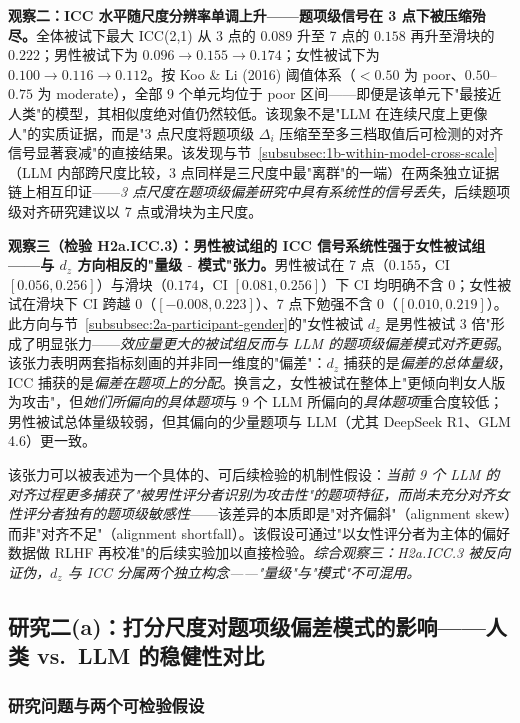 \documentclass[UTF8,12pt]{ctexart}
\begin{document}
\textbf{观察二：ICC 水平随尺度分辨率单调上升——题项级信号在 3 点下被压缩殆尽。}全体被试下最大 ICC(2,1) 从 3 点的 $0.089$ 升至 7 点的 $0.158$ 再升至滑块的 $0.222$；男性被试下为 $0.096 \to 0.155 \to 0.174$；女性被试下为 $0.100 \to 0.116 \to 0.112$。按 Koo \& Li (2016) 阈值体系（$<0.50$ 为 poor、$0.50$--$0.75$ 为 moderate），全部 9 个单元均位于 poor 区间——即便是该单元下"最接近人类"的模型，其相似度绝对值仍然较低。该现象不是"LLM 在连续尺度上更像人"的实质证据，而是"3 点尺度将题项级 $\Delta_i$ 压缩至至多三档取值后可检测的对齐信号显著衰减"的直接结果。该发现与节~\ref{subsubsec:1b-within-model-cross-scale}（LLM 内部跨尺度比较，3 点同样是三尺度中最"离群"的一端）在两条独立证据链上相互印证——\emph{3 点尺度在题项级偏差研究中具有系统性的信号丢失}，后续题项级对齐研究建议以 7 点或滑块为主尺度。

\textbf{观察三（检验 H2a.ICC.3）：男性被试组的 ICC 信号系统性强于女性被试组——与 $d_z$ 方向相反的"量级 $\text{-}$ 模式"张力。}男性被试在 7 点（$0.155$，CI $[0.056, 0.256]$）与滑块（$0.174$，CI $[0.081, 0.256]$）下 CI 均明确不含 0；女性被试在滑块下 CI 跨越 0（$[-0.008, 0.223]$）、7 点下勉强不含 0（$[0.010, 0.219]$）。此方向与节~\ref{subsubsec:2a-participant-gender}的"女性被试 $d_z$ 是男性被试 3 倍"形成了明显张力——\emph{效应量更大的被试组反而与 LLM 的题项级偏差模式对齐更弱}。该张力表明两套指标刻画的并非同一维度的"偏差"：$d_z$ 捕获的是\emph{偏差的总体量级}，ICC 捕获的是\emph{偏差在题项上的分配}。换言之，女性被试在整体上"更倾向判女人版为攻击"，但\emph{她们所偏向的具体题项}与 9 个 LLM 所偏向的\emph{具体题项}重合度较低；男性被试总体量级较弱，但其偏向的少量题项与 LLM（尤其 DeepSeek R1、GLM 4.6）更一致。

该张力可以被表述为一个具体的、可后续检验的机制性假设：\emph{当前 9 个 LLM 的对齐过程更多捕获了"被男性评分者识别为攻击性"的题项特征，而尚未充分对齐女性评分者独有的题项级敏感性}——该差异的本质即是"对齐偏斜"（alignment skew）而非"对齐不足"（alignment shortfall）。该假设可通过"以女性评分者为主体的偏好数据做 RLHF 再校准"的后续实验加以直接检验。\emph{综合观察三：H2a.ICC.3 被反向证伪，$d_z$ 与 ICC 分属两个独立构念——"量级"与"模式"不可混用。}

\subsection{研究二(a)：打分尺度对题项级偏差模式的影响——人类 vs.\ LLM 的稳健性对比}
\label{subsec:results-2a-cross-scale}

\subsubsection{研究问题与两个可检验假设}
\label{subsubsec:2a-cs-hypotheses}
\end{document}
